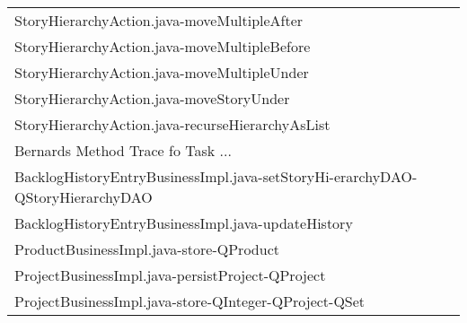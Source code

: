 \begin{table}[t!]
\begin{tabular}{l}
     StoryHierarchyAction.java-moveMultipleAfter                                                                                 \\%
     StoryHierarchyAction.java-moveMultipleBefore                                                                                \\%
     StoryHierarchyAction.java-moveMultipleUnder                                                                                 \\%
     StoryHierarchyAction.java-moveStoryUnder                                                                                    \\%
     StoryHierarchyAction.java-recurseHierarchyAsList                                                                            \\%
%
%
\midrule
\midrule
Bernards Method Trace fo Task ... \\%
 \midrule
     BacklogHistoryEntryBusinessImpl.java-setStoryHi-erarchyDAO-QStoryHierarchyDAO \\%
     BacklogHistoryEntryBusinessImpl.java-updateHistory                          \\%
     ProductBusinessImpl.java-store-QProduct                                    \\%
     ProjectBusinessImpl.java-persistProject-QProject                             \\%
     ProjectBusinessImpl.java-store-QInteger-QProject-QSet        \\%

\end{tabular}
\end{table}
